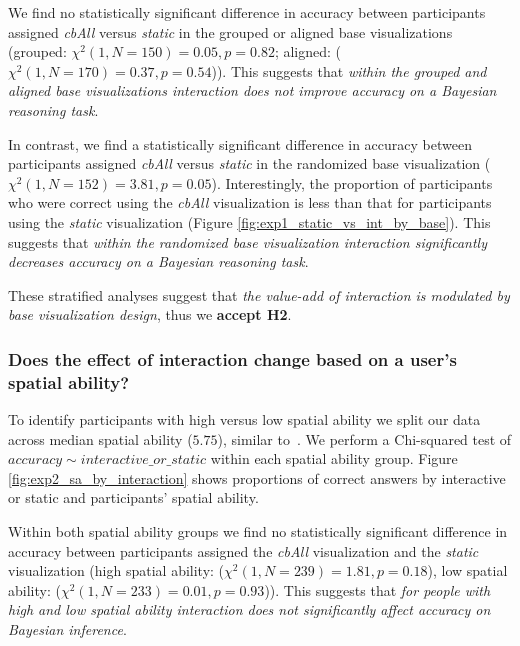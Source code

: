 We find no statistically significant difference in accuracy between participants assigned \textit{cbAll} versus \textit{static} in the grouped or aligned base visualizations (grouped: $\chi^2(1, N = 150) = 0.05, p = 0.82$; aligned: ($\chi^2(1, N = 170) = 0.37, p = 0.54$)). This suggests that \textit{within the grouped and aligned base visualizations interaction does not improve accuracy on a Bayesian reasoning task}.  

In contrast, we find a statistically significant difference in accuracy between participants assigned \textit{cbAll} versus \textit{static} in the randomized base visualization ($\chi^2(1, N = 152) = 3.81, p = 0.05$). Interestingly, the proportion of participants who were correct using the \textit{cbAll} visualization is less than that for participants using the \textit{static} visualization (Figure \ref{fig:exp1_static_vs_int_by_base}). This suggests that \textit{within the randomized base visualization interaction significantly decreases accuracy on a Bayesian reasoning task}. 

\medskip 
These stratified analyses suggest that \textit{the value-add of interaction is modulated by base visualization design}, thus we \textbf{accept H2}.   

\subsubsection{Does the effect of interaction change based on a user's spatial ability?}
To identify participants with high versus low spatial ability we split our data across median spatial ability ($5.75$), similar to~\cite{ottley2016Bayesian}. We perform a Chi-squared test of $accuracy \sim interactive\_or\_static$ within each spatial ability group. Figure \ref{fig:exp2_sa_by_interaction} shows proportions of correct answers by interactive or static and participants' spatial ability.  

Within both spatial ability groups we find no statistically significant difference in accuracy between participants assigned the \textit{cbAll} visualization and the \textit{static} visualization (high spatial ability: ($\chi^2(1, N =  239) = 1.81, p = 0.18$), low spatial ability: ($\chi^2(1, N =  233) = 0.01, p = 0.93$)). This suggests that \textit{for people with high and low spatial ability interaction does not significantly affect accuracy on Bayesian inference}. 

